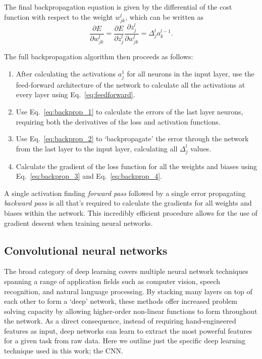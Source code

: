 The final backpropagation equation is given by the differential of the cost function with respect
to the weight $w^{l}_{jk}$, which can be written as
\begin{equation} %
    \frac{\partial E}{\partial w^{l}_{jk}}
    =\frac{\partial E}{\partial z^{l}_{j}}\frac{\partial z^{l}_{j}}{\partial w^{l}_{jk}}
    =\Delta^{l}_{j}a^{l-1}_{k}.
    \label{eq:backprop_4}
\end{equation}

The full backpropagation algorithm then proceeds as follows:
\begin{enumerate}
    \item After calculating the activations $a^{1}_{j}$ for all neurons in the input layer, use
          the feed-forward architecture of the network to calculate all the activations at every
          layer using Eq.~\ref{eq:feedforward}.
    \item Use Eq.~\ref{eq:backprop_1} to calculate the errors of the last layer neurons, requiring
          both the derivatives of the loss and activation functions.
    \item Use Eq.~\ref{eq:backprop_2} to `backpropagate' the error through the network from the
          last layer to the input layer, calculating all $\Delta^{l}_{j}$ values.
    \item Calculate the gradient of the loss function for all the weights and biases using
          Eq.~\ref{eq:backprop_3} and Eq.~\ref{eq:backprop_4}.
\end{enumerate}

A single activation finding \emph{forward pass} followed by a single error propagating
\emph{backward pass} is all that's required to calculate the gradients for all weights and biases
within the network. This incredibly efficient procedure allows for the use of gradient descent
when training neural networks.

\subsection{Convolutional neural networks} %
\label{sec:cnn_theory_conv} %

The broad category of deep learning covers multiple neural network techniques spanning a range of
application fields such as computer vision, speech recognition, and natural language processing.
By stacking many layers on top of each other to form a `deep' network, these methods offer
increased problem solving capacity by allowing higher-order non-linear functions to form
throughout the network. As a direct consequence, instead of requiring hand-engineered features as
input, deep networks can learn to extract the most powerful features for a given task from raw
data. Here we outline just the specific deep learning technique used in this work; the CNN.

